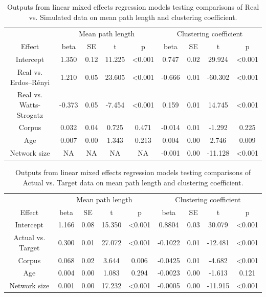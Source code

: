 \documentclass[
  man]{apa6}
\begin{document}
\begin{longtable}[t]{ccccccccc}
\caption{\label{tab:table-real-sim}Outputs from linear mixed effects regression models testing comparisons of Real vs. Simulated data on mean path length and clustering coefficient.}\\
\toprule
\multicolumn{1}{c}{ } & \multicolumn{4}{c}{Mean path length} & \multicolumn{4}{c}{Clustering coefficient} \\
\cmidrule(l{3pt}r{3pt}){2-5} \cmidrule(l{3pt}r{3pt}){6-9}
Effect & beta & SE & t & p & beta & SE & t & p\\
\midrule
Intercept & 1.350 & 0.12 & 11.225 & <0.001 & 0.747 & 0.02 & 29.924 & <0.001\\
Real vs. Erdos–Rényi & 1.210 & 0.05 & 23.605 & <0.001 & -0.666 & 0.01 & -60.302 & <0.001\\
Real vs. Watts-Strogatz & -0.373 & 0.05 & -7.454 & <0.001 & 0.159 & 0.01 & 14.745 & <0.001\\
Corpus & 0.032 & 0.04 & 0.725 & 0.471 & -0.014 & 0.01 & -1.292 & 0.225\\
Age & 0.007 & 0.00 & 1.343 & 0.213 & 0.004 & 0.00 & 2.746 & 0.009\\
\addlinespace
Network size & NA & NA & NA & NA & -0.001 & 0.00 & -11.128 & <0.001\\
\bottomrule
\end{longtable}

\begin{longtable}[t]{ccccccccc}
\caption{\label{tab:table-actual-target}Outputs from linear mixed effects regression models testing comparisons of Actual vs. Target data on mean path length and clustering coefficient.}\\
\toprule
\multicolumn{1}{c}{ } & \multicolumn{4}{c}{Mean path length} & \multicolumn{4}{c}{Clustering coefficient} \\
\cmidrule(l{3pt}r{3pt}){2-5} \cmidrule(l{3pt}r{3pt}){6-9}
Effect & beta & SE & t & p & beta & SE & t & p\\
\midrule
Intercept & 1.166 & 0.08 & 15.350 & <0.001 & 0.8804 & 0.03 & 30.079 & <0.001\\
Actual vs. Target & 0.300 & 0.01 & 27.072 & <0.001 & -0.1022 & 0.01 & -12.481 & <0.001\\
Corpus & 0.068 & 0.02 & 3.644 & 0.006 & -0.0425 & 0.01 & -4.682 & <0.001\\
Age & 0.004 & 0.00 & 1.083 & 0.294 & -0.0023 & 0.00 & -1.613 & 0.121\\
Network size & 0.001 & 0.00 & 17.232 & <0.001 & -0.0005 & 0.00 & -11.915 & <0.001\\
\bottomrule
\end{longtable}
\end{document}
